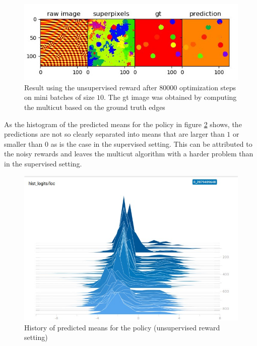 \begin{figure}[ht!]
	\centering
	\includegraphics[width=.8\textwidth]{figures/plots/res_unsup.jpeg}
	\caption{Result using the unsupervised reward after $80000$ optimization steps on mini batches of size $10$. The gt image was obtained by computing the multicut based on the ground truth edges}
	\label{fig:resa_dice}
\end{figure}
As the histogram of the predicted means for the policy in figure \ref{fig:resa_dice} shows, the predictions are not so clearly separated into means that are larger than $1$ or smaller than $0$ as is the case in the supervised setting. This can be attributed to the noisy rewards and leaves the multicut algorithm with a harder problem than in the supervised setting.\\
\begin{figure}[ht!]
	\centering
	\includegraphics[width=.6\textwidth]{figures/plots/hist_unsup.jpeg}
	\caption{History of predicted means for the policy (unsupervised reward setting)}
	\label{fig:resa_dice}
\end{figure}

